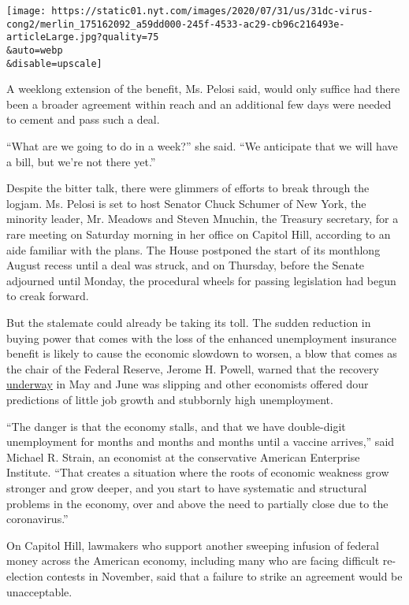 \texttt{[image: https://static01.nyt.com/images/2020/07/31/us/31dc-virus-cong2/merlin\_175162092\_a59dd000-245f-4533-ac29-cb96c216493e-articleLarge.jpg?quality=75\\\&auto=webp\\\&disable=upscale]}

A weeklong extension of the benefit, Ms. Pelosi said, would only suffice
had there been a broader agreement within reach and an additional few
days were needed to cement and pass such a deal.

``What are we going to do in a week?'' she said. ``We anticipate that we
will have a bill, but we're not there yet.''

Despite the bitter talk, there were glimmers of efforts to break through
the logjam. Ms. Pelosi is set to host Senator Chuck Schumer of New York,
the minority leader, Mr. Meadows and Steven Mnuchin, the Treasury
secretary, for a rare meeting on Saturday morning in her office on
Capitol Hill, according to an aide familiar with the plans. The House
postponed the start of its monthlong August recess until a deal was
struck, and on Thursday, before the Senate adjourned until Monday, the
procedural wheels for passing legislation had begun to creak forward.

But the stalemate could already be taking its toll. The sudden reduction
in buying power that comes with the loss of the enhanced unemployment
insurance benefit is likely to cause the economic slowdown to worsen, a
blow that comes as the chair of the Federal Reserve, Jerome H. Powell,
warned that the recovery
\href{https://www.nytimes.com/2020/07/29/business/economy/federal-reserve-meeting-interest-rates.html}{underway}
in May and June was slipping and other economists offered dour
predictions of little job growth and stubbornly high unemployment.

``The danger is that the economy stalls, and that we have double-digit
unemployment for months and months and months until a vaccine arrives,''
said Michael R. Strain, an economist at the conservative American
Enterprise Institute. ``That creates a situation where the roots of
economic weakness grow stronger and grow deeper, and you start to have
systematic and structural problems in the economy, over and above the
need to partially close due to the coronavirus.''

On Capitol Hill, lawmakers who support another sweeping infusion of
federal money across the American economy, including many who are facing
difficult re-election contests in November, said that a failure to
strike an agreement would be unacceptable.


